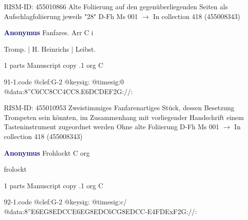 \documentclass[twocolumn]{book}
\begin{document}
\newline RISM-ID: 455010866
\newline Alte Foliierung auf den gegenüberliegenden Seiten als Aufschlagfoliierung jeweils "28"
\newline D-Fh  Ms 001
\newline $\rightarrow$ In collection 418 (455008343)

\newline \par \vspace{7pt} \textcolor{darkblue}{\textbf{Anonymus  }}
\newline Fanfares. Arr  C  
\newline i
\newline \begin{itshape}[f.76r, at left:] Tromp. | H. Heinrichs | Leibst.\end{itshape} 
\newline \textcolor{darkblue}{}  1 parts  
\newline Manuscript copy
.1  org  C  
\begin{filecontents*}{91-1.code}
@clef:G-2
@keysig:
@timesig:0
@data:{8''C6CC8CC}4CC{8.E6D}{CDEF}2G://:
\end{filecontents*}
\newline
%

\newline RISM-ID: 455010953
\newline Zweistimmiges Fanfarenartiges Stück, dessen Besetzung Trompeten sein könnten, im Zusammenhang mit vorliegender Handschrift einem Tasteninstrument zugeordnet werden
\newline Ohne alte Foliierung
\newline D-Fh  Ms 001
\newline $\rightarrow$ In collection 418 (455008343)

\newline \par \vspace{7pt} \textcolor{darkblue}{\textbf{Anonymus  }}
\newline Frohlockt  C  
\newline org
\newline \begin{itshape}[f.67v, at left:] frolockt\end{itshape} 
\newline \textcolor{darkblue}{}  1 parts  
\newline Manuscript copy
.1  org  C  
\begin{filecontents*}{92-1.code}
@clef:G-2
@keysig:
@timesig:c/
@data:{8''E6EG8ED}{CC}{E6EG8ED}{C6CG8ED}{CC}-E4FDExF2G://:
\end{filecontents*}
\newline
%
\end{document}
